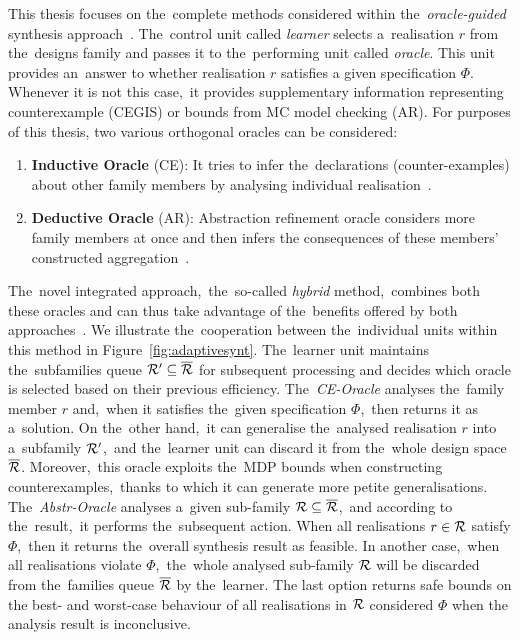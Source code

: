 This thesis focuses on the~complete methods considered within the~\textit{oracle-guided} synthesis approach~\cite{oracle1,oracle2}.
The~control unit called \textit{learner} selects a~realisation $r$ from the~designs family and passes it to the~performing unit called \textit{oracle}.
This unit provides an~answer to whether realisation $r$ satisfies a given specification $\varPhi$.
Whenever it is not this case,~it provides supplementary information representing counterexample (CEGIS) or bounds from MC model checking (AR).
For purposes of this thesis, two various orthogonal oracles can be considered:
\begin{enumerate}[label=(\roman*)]
    \item \textbf{Inductive Oracle} (CE): It tries to infer the~declarations (counter-examples) about other family members by analysing individual realisation~\cite{cegis}.
    \item \textbf{Deductive Oracle} (AR): Abstraction refinement oracle considers more family members at once and then infers the consequences of these members' constructed aggregation~\cite{cegar}.
\end{enumerate}
The~novel integrated approach,~the~so-called \textit{hybrid} method,~combines both these oracles and can thus take advantage of the~benefits offered by both approaches~\cite{roman-DP,tacas21}.
We illustrate the~cooperation between the~individual units within this method in Figure~\ref{fig:adaptivesynt}.
The~learner unit maintains the~subfamilies queue $\mathcal{R}' \subseteq \overline{\mathcal{R}}$ for subsequent processing and decides which oracle is selected based on their previous efficiency.
The~\textit{CE-Oracle} analyses the~family member $r$ and,~when it satisfies the~given specification $\varPhi$,~then returns it as a~solution.
On the~other hand,~it can generalise the~analysed realisation $r$ into a~subfamily $\mathcal{R}'$,~and the~learner unit can discard it from the~whole design space $\overline{\mathcal{R}}$.
Moreover,~this oracle exploits the~MDP bounds when constructing counterexamples,~thanks to which it can generate more petite generalisations.
The~\textit{Abstr-Oracle} analyses a~given sub-family $\mathcal{R} \subseteq \overline{\mathcal{R}}$,~and according to the~result,~it performs the~subsequent action.
When all realisations $r \in \mathcal{R}$ satisfy $\varPhi$,~then it returns the~overall synthesis result as feasible.
In another case,~when all realisations violate $\varPhi$,~the~whole analysed sub-family $\mathcal{R}$ will be discarded from the~families queue $\overline{\mathcal{R}}$ by the~learner.
The last option returns safe bounds on the best- and worst-case behaviour of all realisations in $\mathcal{R}$ considered $\varPhi$ when the analysis result is inconclusive.

